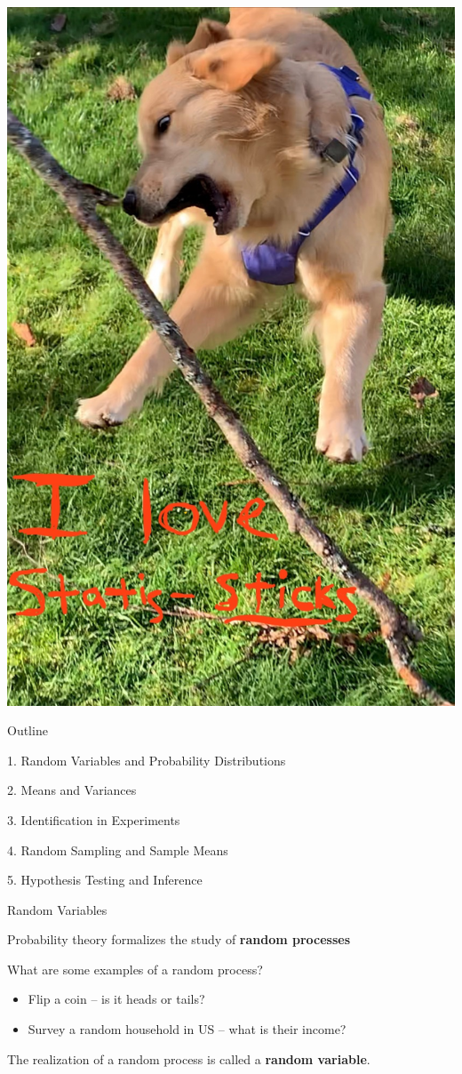 \documentclass[11pt,english,handout]{beamer}
\newenvironment{wideitemize}{\itemize\addtolength{\itemsep}{10pt}}{\enditemize}
\begin{document}
\begin{frame}
	\centering
	\includegraphics[width = 0.5 \linewidth]{poppy_stick.jpg}
\end{frame}



\begin{frame}{Outline}
	
	1. Random Variables and Probability Distributions
	\vspace{0.8cm}
	
	2. Means and Variances
	\vspace{0.8cm}

	3. Identification in Experiments 
	\vspace{0.8cm}
		
	4. Random Sampling and Sample Means
	
	\vspace{0.8cm}
	5. Hypothesis Testing and Inference
	
\end{frame}


\begin{frame}{Random Variables}
\begin{wideitemize} 
\item
Probability theory formalizes the study of \textbf{random processes}\pause{}
\bigskip

\item What are some examples of a random process?\pause{}\smallskip
\begin{itemize}
	\item Flip a coin -- is it heads or tails? \smallskip
	\item Survey a random household in US -- what is their income? 
\end{itemize}
\pause{}
\bigskip

\item The realization of a random process is called a \textbf{random variable}.


\end{wideitemize}

\end{frame}
\end{document}
